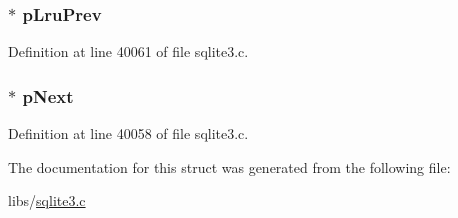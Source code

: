 \subsubsection[{p\+Lru\+Prev}]{$\ast$ p\+Lru\+Prev}\label{struct_pg_hdr1_ab5b315b564cf7865933552b7cb0ab73a}


Definition at line 40061 of file sqlite3.\+c.

\hypertarget{struct_pg_hdr1_ad77a4bf60faacf9effe28c843582bf51}{}
\subsubsection[{p\+Next}]{$\ast$ p\+Next}\label{struct_pg_hdr1_ad77a4bf60faacf9effe28c843582bf51}


Definition at line 40058 of file sqlite3.\+c.



The documentation for this struct was generated from the following file\+:\begin{DoxyCompactItemize}
\item 
libs/\hyperlink{sqlite3_8c}{sqlite3.\+c}\end{DoxyCompactItemize}
